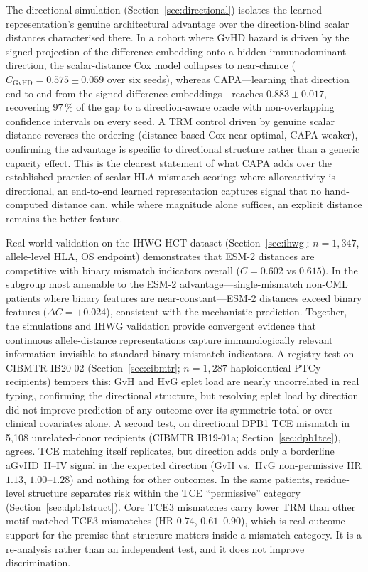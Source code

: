 \documentclass[11pt,a4paper]{article}
\begin{document}
The directional simulation (Section~\ref{sec:directional}) isolates the learned
representation's genuine architectural advantage over the direction-blind
scalar distances characterised there.  In a cohort where GvHD hazard is driven by the signed
projection of the difference embedding onto a hidden immunodominant direction,
the scalar-distance Cox model collapses to near-chance ($C_{\mathrm{GvHD}} =
0.575 \pm 0.059$ over six seeds), whereas CAPA---learning that direction
end-to-end from the signed difference embeddings---reaches $0.883 \pm 0.017$,
recovering $97\,\%$ of the gap to a direction-aware oracle with non-overlapping
confidence intervals on every seed.  A TRM control driven by genuine scalar
distance reverses the ordering (distance-based Cox near-optimal, CAPA weaker),
confirming the advantage is specific to directional structure rather than a
generic capacity effect.  This is the clearest statement of what CAPA adds over
the established practice of scalar HLA mismatch scoring: where alloreactivity is
directional, an end-to-end learned representation captures signal that no
hand-computed distance can, while where magnitude alone suffices, an explicit
distance remains the better feature.

Real-world validation on the IHWG HCT dataset (Section~\ref{sec:ihwg};
$n=1{,}347$, allele-level HLA, OS endpoint) demonstrates that ESM-2 distances
are competitive with binary mismatch indicators overall ($C = 0.602$ vs
$0.615$).  In the subgroup most amenable to the ESM-2 advantage---single-mismatch
non-CML patients where binary features are near-constant---ESM-2 distances
exceed binary features ($\Delta C = +0.024$), consistent with the mechanistic
prediction.  Together, the simulations and IHWG validation provide convergent
evidence that continuous allele-distance representations capture immunologically
relevant information invisible to standard binary mismatch indicators.
A registry test on CIBMTR IB20-02 (Section~\ref{sec:cibmtr}; $n=1{,}287$
haploidentical PTCy recipients) tempers this: GvH and HvG eplet load are
nearly uncorrelated in real typing, confirming the directional structure, but
resolving eplet load by direction did not improve prediction of any outcome
over its symmetric total or over clinical covariates alone.  A second test,
on directional DPB1 TCE mismatch in 5{,}108 unrelated-donor recipients
(CIBMTR IB19-01a; Section~\ref{sec:dpb1tce}), agrees.  TCE matching itself
replicates, but direction adds only a borderline aGvHD~II--IV signal in the
expected direction (GvH vs.\ HvG non-permissive HR $1.13$, $1.00$--$1.28$)
and nothing for other outcomes.  In the same patients, residue-level
structure separates risk within the TCE ``permissive'' category
(Section~\ref{sec:dpb1struct}).  Core TCE3 mismatches carry lower TRM than
other motif-matched TCE3 mismatches (HR $0.74$, $0.61$--$0.90$), which is
real-outcome support for the premise that structure matters inside a
mismatch category.  It is a re-analysis rather than an independent test,
and it does not improve discrimination.
\end{document}
